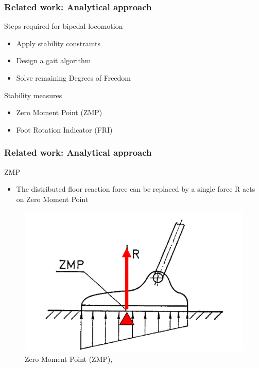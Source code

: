 \documentclass{beamer}
\begin{document}

	\begin{frame}
		\frametitle{Related work: Analytical approach}
		\begin{block}{Steps required for bipedal locomotion}
			\begin{itemize}
				\item
					Apply stability constraints
				\item
					Design a gait algorithm
				\item
					Solve remaining Degrees of Freedom
			\end{itemize}
		\end{block}
		\begin{block}{Stability measures}
			\begin{itemize}
				\item
					Zero Moment Point (ZMP)
				\item
					Foot Rotation Indicator (FRI)
			\end{itemize}
		\end{block}
	\end{frame}
	

	\begin{frame}
		\frametitle{Related work: Analytical approach}
		\begin{block}{ZMP}
			\begin{itemize}
				\item
					The distributed floor reaction force can be replaced by a single force R
acts on Zero Moment Point
			\end{itemize}
		\end{block}
		
		\begin{figure}[h!]
			\begin{minipage}[H]{\linewidth}
				\centering
				\includegraphics[width=0.5\linewidth]{presentation_images/8}
				\caption{Zero Moment Point (ZMP), \cite{vukobratovic2004zero}}
			\end{minipage}
		\end{figure}
	\end{frame}
	
\end{document}
